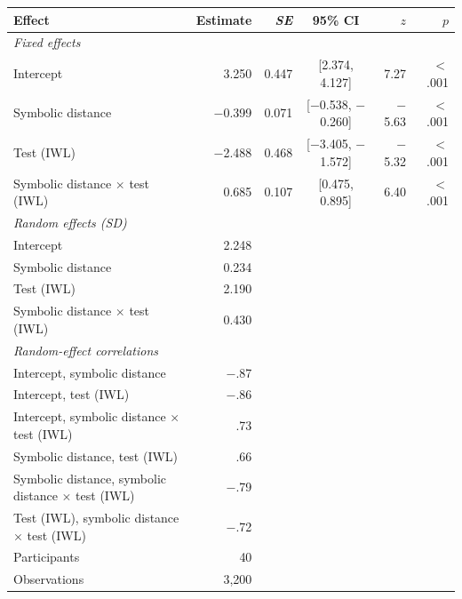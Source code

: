 \begin{tabular}{lrrcrr}
\toprule
Effect & Estimate & \textit{SE} & 95\% CI & $z$ & $p$ \\
\midrule
\multicolumn{6}{l}{\textit{Fixed effects}} \\
\quad Intercept & 3.250 & 0.447 & [2.374, 4.127] & 7.27 & $<$.001 \\
\quad Symbolic distance & $-$0.399 & 0.071 & [$-$0.538, $-$0.260] & $-$5.63 & $<$.001 \\
\quad Test (IWL) & $-$2.488 & 0.468 & [$-$3.405, $-$1.572] & $-$5.32 & $<$.001 \\
\quad Symbolic distance $\times$ test (IWL) & 0.685 & 0.107 & [0.475, 0.895] & 6.40 & $<$.001 \\
\multicolumn{6}{l}{\textit{Random effects (SD)}} \\
\quad Intercept & 2.248 \\
\quad Symbolic distance & 0.234 \\
\quad Test (IWL) & 2.190 \\
\quad Symbolic distance $\times$ test (IWL) & 0.430 \\
\multicolumn{6}{l}{\textit{Random-effect correlations}} \\
\quad Intercept, symbolic distance & $-$.87 \\
\quad Intercept, test (IWL) & $-$.86 \\
\quad Intercept, symbolic distance $\times$ test (IWL) & .73 \\
\quad Symbolic distance, test (IWL) & .66 \\
\quad Symbolic distance, symbolic distance $\times$ test (IWL) & $-$.79 \\
\quad Test (IWL), symbolic distance $\times$ test (IWL) & $-$.72 \\
\midrule
Participants & 40 \\
Observations & 3,200 \\
\bottomrule
\end{tabular}
